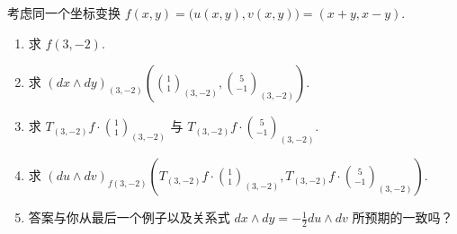 \begin{question}\label{q:6-5}
考虑同一个坐标变换 $f(x,y)=\bigl(u(x,y),v(x,y)\bigr)=(x+y,x-y)$.
\begin{enumerate}
  \item[(a)] 求 $f(3,-2)$.
  \item[(b)] 求 $(dx\wedge dy)_{(3,-2)}\left(\binom{1}{1}_{(3,-2)},\binom{5}{-1}_{(3,-2)}\right)$.
  \item[(c)] 求 $T_{(3,-2)}f\cdot\binom{1}{1}_{(3,-2)}$ 与 $T_{(3,-2)}f\cdot\binom{5}{-1}_{(3,-2)}$.
  \item[(d)] 求 $(du\wedge dv)_{f(3,-2)}\left(T_{(3,-2)}f\cdot\binom{1}{1}_{(3,-2)},T_{(3,-2)}f\cdot\binom{5}{-1}_{(3,-2)}\right)$.
  \item[(e)] 答案与你从最后一个例子以及关系式 $dx\wedge dy=-\frac12du\wedge dv$ 所预期的一致吗？
\end{enumerate}
\end{question}

